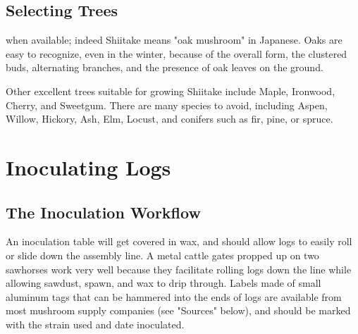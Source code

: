 \documentclass{tufte-handout}
\begin{document}
\subsection{Selecting Trees}


 when available; indeed Shiitake means "oak mushroom" in Japanese.   
Oaks are easy to recognize, even in the winter, because of the overall form, the clustered buds, alternating branches, and the presence of oak leaves on the ground.  

Other excellent trees suitable for growing Shiitake include Maple, Ironwood, Cherry, and Sweetgum.
There are many species to avoid, including Aspen, Willow, Hickory, Ash, Elm, Locust, and conifers such as fir, pine, or spruce.

\section{Inoculating Logs}



\subsection{The Inoculation Workflow}

An inoculation table will get covered in wax, and should allow logs to easily roll or slide down the assembly line. 
A metal cattle gates propped up on two
sawhorses work very well because they
facilitate rolling logs down the line while
allowing sawdust, spawn, and wax to drip
through. 
Labels made of small aluminum tags that can be hammered into the ends of logs are available from most mushroom supply companies (see "Sources" below), and should be marked with the strain used and date inoculated.
\end{document}

